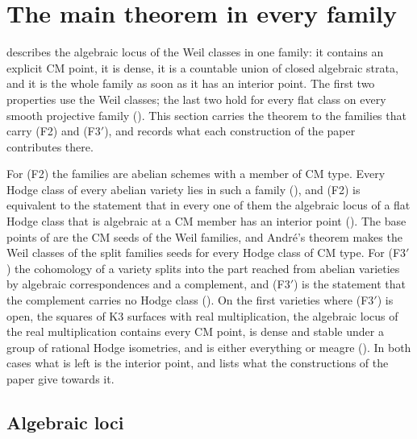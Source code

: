 \section{The main theorem in every family}\label{sec:families}

\cite[Theorem~1.1]{paperI} describes the algebraic locus of the Weil classes in one
family: it contains an explicit CM point, it is dense, it is a countable union
of closed algebraic strata, and it is the whole family as soon as it has an
interior point. The first two properties use the Weil classes; the last two
hold for every flat class on every smooth projective family
(). This section carries the theorem to the families that
carry (F2) and
\textup{(F3$'$)}, and records what each construction of the paper
contributes there.

For (F2) the families are abelian schemes with a member of CM type. Every
Hodge class of every abelian variety lies in such a family
(), and (F2) is equivalent to the statement that in every
one of them the algebraic locus of a flat Hodge class that is algebraic at a
CM member has an interior point (). The base points
of \cite[Theorem~17.5]{paperI} are the CM seeds of the Weil families, and
Andr\'e's theorem makes the Weil classes of the split families seeds for every
Hodge class of CM type. For \textup{(F3$'$)} the cohomology of a variety splits
into the part reached from abelian varieties by algebraic correspondences and
a complement, and \textup{(F3$'$)} is the statement that the complement
carries no Hodge class (). On the first varieties where
\textup{(F3$'$)} is open, the squares of K3 surfaces with real
multiplication, the algebraic locus of the real multiplication contains every
CM point, is dense and stable under a group of rational Hodge isometries, and
is either everything or meagre (). In both cases what is
left is the interior point, and  lists what the
constructions of the paper give towards it.

\subsection{Algebraic loci}\label{ssec:algloci}

